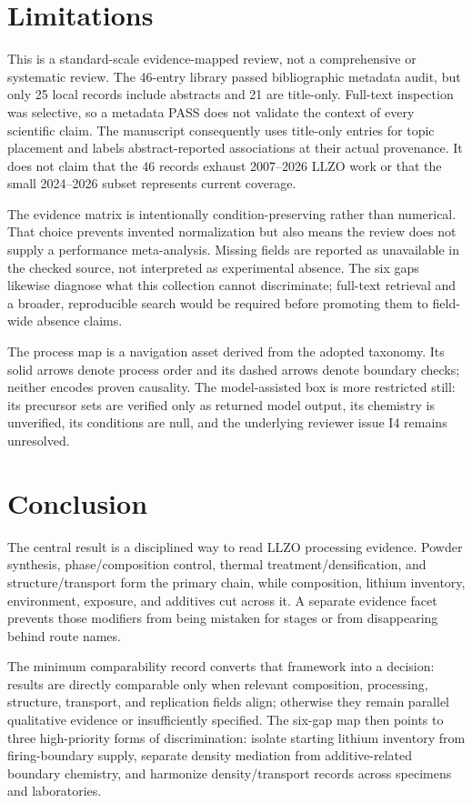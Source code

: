 \section{Limitations}

This is a standard-scale evidence-mapped review, not a comprehensive or systematic review. The 46-entry library passed bibliographic metadata audit, but only 25 local records include abstracts and 21 are title-only. Full-text inspection was selective, so a metadata PASS does not validate the context of every scientific claim. The manuscript consequently uses title-only entries for topic placement and labels abstract-reported associations at their actual provenance. It does not claim that the 46 records exhaust 2007--2026 LLZO work or that the small 2024--2026 subset represents current coverage.

The evidence matrix is intentionally condition-preserving rather than numerical. That choice prevents invented normalization but also means the review does not supply a performance meta-analysis. Missing fields are reported as unavailable in the checked source, not interpreted as experimental absence. The six gaps likewise diagnose what this collection cannot discriminate; full-text retrieval and a broader, reproducible search would be required before promoting them to field-wide absence claims.

The process map is a navigation asset derived from the adopted taxonomy. Its solid arrows denote process order and its dashed arrows denote boundary checks; neither encodes proven causality. The model-assisted box is more restricted still: its precursor sets are verified only as returned model output, its chemistry is unverified, its conditions are null, and the underlying reviewer issue I4 remains unresolved.

\section{Conclusion}

The central result is a disciplined way to read LLZO processing evidence. Powder synthesis, phase\slash composition control, thermal treatment\slash densification, and structure\slash transport form the primary chain, while composition, lithium inventory, environment, exposure, and additives cut across it. A separate evidence facet prevents those modifiers from being mistaken for stages or from disappearing behind route names.

The minimum comparability record converts that framework into a decision: results are directly comparable only when relevant composition, processing, structure, transport, and replication fields align; otherwise they remain parallel qualitative evidence or insufficiently specified. The six-gap map then points to three high-priority forms of discrimination: isolate starting lithium inventory from firing-boundary supply, separate density mediation from additive-related boundary chemistry, and harmonize density\slash transport records across specimens and laboratories.

